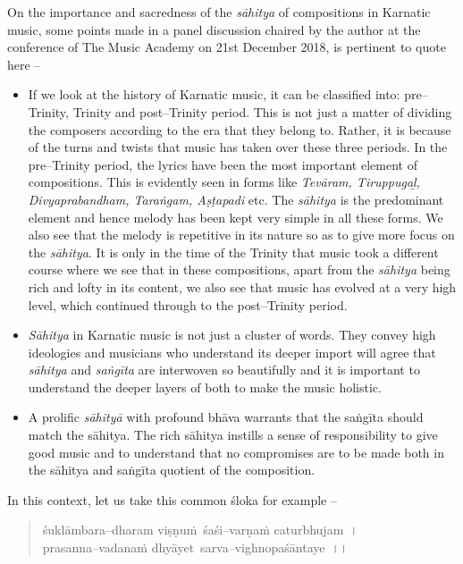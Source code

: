 On the importance and sacredness of the \textit{sāhitya} of compositions in Karnatic music, some points made in a panel discussion chaired by the author at the conference of The Music Academy on 21st December 2018, is pertinent to quote here –

\begin{itemize}
\item If we look at the history of Karnatic music, it can be classified into: pre–Trinity, Trinity and post–Trinity period. This is not just a matter of dividing the composers according to the era that they belong to. Rather, it is because of the turns and twists that music has taken over these three periods. In the pre–Trinity period, the lyrics have been the most important element of compositions. This is evidently seen in forms like \textit{Tevāram, Tiruppugaḻ, Divyaprabandham, Taraṅgam, Aṣṭapadi} etc. The \textit{sāhitya} is the predominant element and hence melody has been kept very simple in all these forms. We also see that the melody is repetitive in its nature so as to give more focus on the \textit{sāhitya}. It is only in the time of the Trinity that music took a different course where we see that in these compositions, apart from the \textit{sāhitya} being rich and lofty in its content, we also see that music has evolved at a very high level, which continued through to the post–Trinity period.

 \item \textit{Sāhitya} in Karnatic music is not just a cluster of words. They convey high ideologies and musicians who understand its deeper import will agree that \textit{sāhitya} and \textit{saṅgīta} are interwoven so beautifully and it is important to understand the deeper layers of both to make the music holistic.

 \item A prolific \textit{sāhityā} with profound bhāva warrants that the saṅgīta should match the sāhitya. The rich sāhitya instills a sense of responsibility to give good music and to understand that no compromises are to be made both in the sāhitya and saṅgīta quotient of the composition.

\end{itemize}

In this context, let us take this common śloka for example –

\begin{verse}
śuklāmbara–dharam viṣṇuṁ śaśi–varṇaṁ caturbhujam~।\\ prasanna–vadanaṁ dhyāyet sarva–vighnopaśāntaye~।। 
\end{verse}

